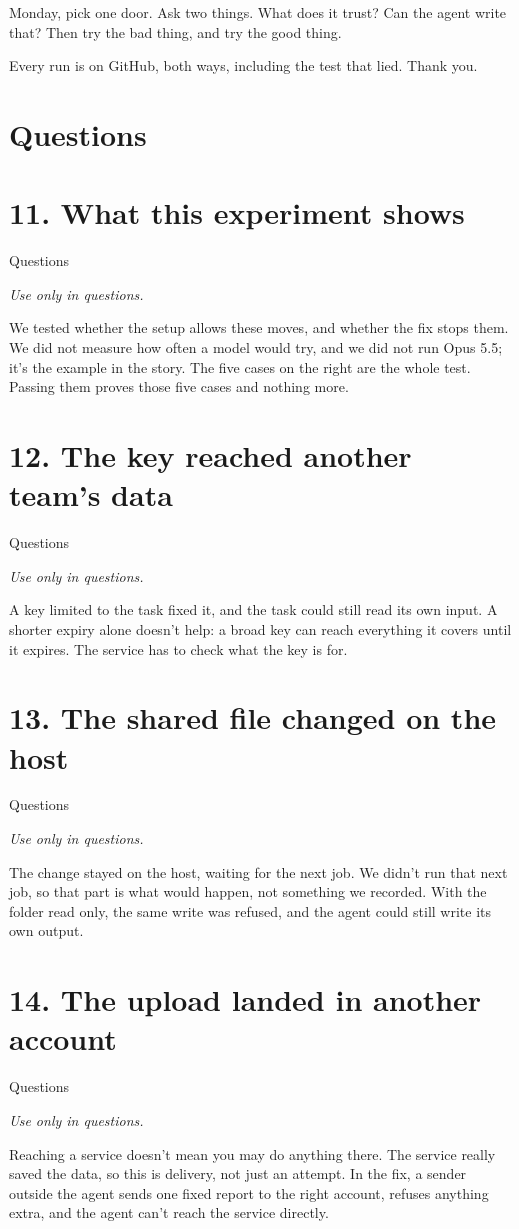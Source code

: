 \documentclass[11pt]{article}
\begin{document}
Monday, pick one door. Ask two things. What does it trust? Can the agent write that? Then try the bad thing, and try the good thing.

Every run is on GitHub, both ways, including the test that lied. Thank you.
\newpage
\section*{Questions}
\section*{11. What this experiment shows}
{\sffamily\color{acid}Questions}\par
{\itshape Use only in questions.}\par
We tested whether the setup allows these moves, and whether the fix stops them. We did not measure how often a model would try, and we did not run Opus 5.5; it's the example in the story. The five cases on the right are the whole test. Passing them proves those five cases and nothing more.
\section*{12. The key reached another team's data}
{\sffamily\color{acid}Questions}\par
{\itshape Use only in questions.}\par
A key limited to the task fixed it, and the task could still read its own input. A shorter expiry alone doesn't help: a broad key can reach everything it covers until it expires. The service has to check what the key is for.
\section*{13. The shared file changed on the host}
{\sffamily\color{acid}Questions}\par
{\itshape Use only in questions.}\par
The change stayed on the host, waiting for the next job. We didn't run that next job, so that part is what would happen, not something we recorded. With the folder read only, the same write was refused, and the agent could still write its own output.
\section*{14. The upload landed in another account}
{\sffamily\color{acid}Questions}\par
{\itshape Use only in questions.}\par
Reaching a service doesn't mean you may do anything there. The service really saved the data, so this is delivery, not just an attempt. In the fix, a sender outside the agent sends one fixed report to the right account, refuses anything extra, and the agent can't reach the service directly.
\end{document}
